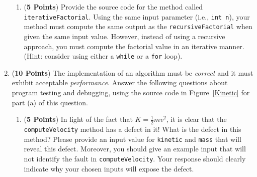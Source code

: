 \documentclass[12pt]{article}
\begin{document}
\begin{enumerate}
\begin{enumerate}

\item ({\bf 5 Points}) Provide the source code for the method called {\tt iterativeFactorial}.  Using the same input
  parameter (i.e., {\tt int n}), your method must compute the same output as the {\tt recursiveFactorial} when given the
  same input value.  However, instead of using a recursive approach, you must compute the factorial value in an
  iterative manner.  (Hint: consider using either a {\tt while} or a {\tt for} loop).


\end{enumerate}

\newpage


\item ({\bf 10 Points}) The implementation of an algorithm must be
  {\em correct} and it must exhibit acceptable {\em performance}.
  Answer the following questions about program testing and debugging,
  using the source code in Figure~\ref{Kinetic} for part (a) of this
  question.

\begin{enumerate}
  
\item ({\bf 5 Points}) In light of the fact that $K = \frac{1}{2}mv^2$, it is clear that the {\tt computeVelocity}
  method has a defect in it!  What is the defect in this method?  Please provide an input value for {\tt kinetic} and
  {\tt mass} that will reveal this defect.  Moreover, you should give an example input that will not identify the fault
  in {\tt computeVelocity}.  Your response should clearly indicate why your chosen inputs will expose the defect.


\end{enumerate}
\end{enumerate}
\end{document}

